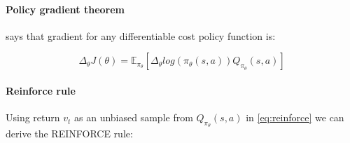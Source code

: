 \paragraph{Policy gradient theorem} says that gradient
for any differentiable cost policy function is:

\begin{equation} \label{eq:reinforce}
	\Delta_{\theta} J(\theta) = \mathbb{E}_{\pi_{\theta}}
		[\Delta_{\theta} log(
		\pi_{\theta}(s, a) )  Q_{\pi_{\theta}}(s, a)]
\end{equation}


\paragraph{Reinforce rule}
Using return $v_t$ as an unbiased sample from $Q_{\pi_{\theta}}(s, a)$
in \ref{eq:reinforce} we can derive the REINFORCE rule:

%
%


%







%

